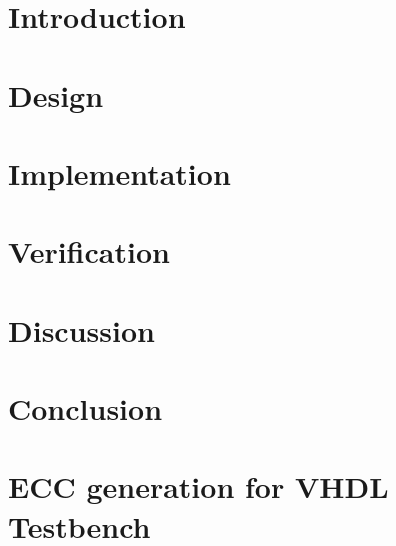 \documentclass[titlepage,12pt,a4paper]{article}
\begin{document}


\newpage
\tableofcontents
\listoffigures
\listoftables

\newpage
{}

\section{Introduction}

\newpage
\section{Design}

\newpage
\section{Implementation}

\newpage
\section{Verification}

\newpage
\section{Discussion}

\newpage
\section{Conclusion}

\newpage

\appendix
\section{ECC generation for VHDL Testbench}
\label{apx:ecc}



\end{document}

